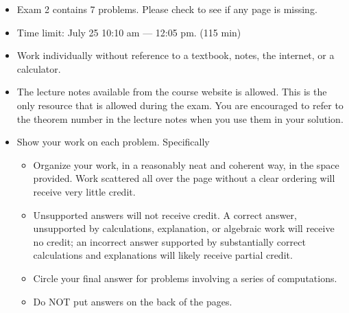 \documentclass[12pt]{amsart}
\theoremstyle{definition}
\begin{document}


\vspace{3em}

\begin{itemize}
\item Exam 2 contains 7 problems. Please check to see if any page is missing.\vspace{1em}
\item Time limit: July 25 10:10 am --- 12:05 pm. (115 min)\vspace{1em}
\item Work individually without reference to a textbook, notes, the internet, or a calculator.\vspace{1em}
\item The lecture notes available from the course website is allowed. This is the only resource that is allowed during the exam. You are encouraged to refer to the theorem number in the lecture notes when you use them in your solution.\vspace{1em}
\item Show your work on each problem. Specifically\vspace{0.5em}
\begin{itemize}
\item Organize your work, in a reasonably neat and coherent way, in the space provided. Work scattered all over the page without a clear ordering
will receive very little credit.\vspace{0.5em}
\item Unsupported answers will not receive credit. A correct answer, unsupported by calculations, explanation, or algebraic work will receive no credit; an incorrect answer supported by substantially correct calculations and explanations will likely receive partial credit.\vspace{0.5em}
\item Circle your final answer for problems involving a series of computations.\vspace{0.5em}
\item Do NOT put answers on the back of the pages.
\end{itemize}
\end{itemize}



\vspace{2em}
\newpage
\end{document}
